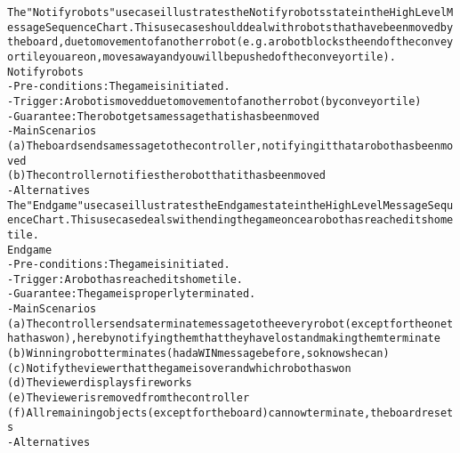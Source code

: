 \begin{alltt}
The "Notify robots" use case illustrates the Notify robots state in the High Level Message Sequence Chart. This use case should deal with robots that have been moved by the board, due to movement of another robot (e.g. a robot blocks the end of the conveyor tile you are on, moves away and you will be pushed of the conveyor tile). \\

Notify robots
- Pre-conditions: The game is initiated.
- Trigger: A robot is moved due to movement of another robot (by conveyor tile)
- Guarantee: The robot gets a message that is has been moved
- Main Scenarios
    (a) The board sends a message to the controller, notifying it that a robot has been moved
    (b) The controller notifies the robot that it has been moved
- Alternatives \\

The "End game" use case illustrates the End game state in the High Level Message Sequence Chart. This use case deals with ending the game once a robot has reached its home tile. \\

End game
- Pre-conditions: The game is initiated.
- Trigger:  A robot has reached its home tile.
- Guarantee: The game is properly terminated.
- Main Scenarios
    (a) The controller sends a terminate message to the every robot (except for the one that has won), hereby notifying them that they have lost and making them terminate
    (b) Winning robot terminates (had a WIN message before, so knows he can)
    (c) Notify the viewer that the game is over and which robot has won
    (d) The viewer displays fireworks
    (e) The viewer is removed from the controller
    (f) All remaining objects (except for the board) can now terminate, the board resets
- Alternatives

\end{alltt}

